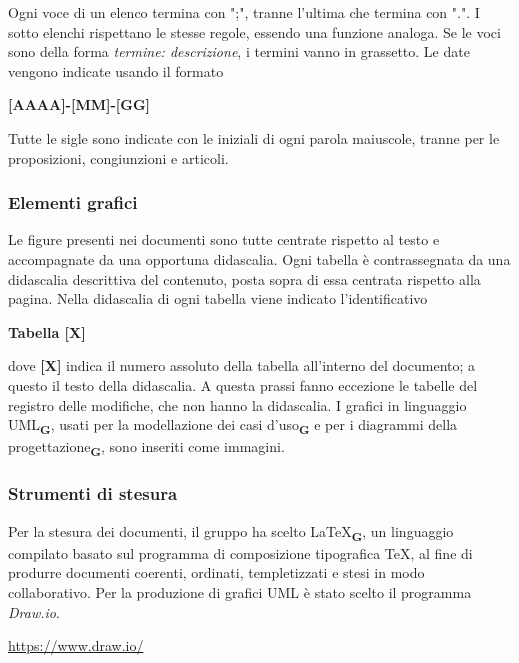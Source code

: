 Ogni voce di un elenco termina con ";", tranne l'ultima che termina con ".". I sotto elenchi rispettano le stesse regole, essendo una funzione analoga. Se le voci sono della forma \textit{termine: descrizione}, i termini vanno in grassetto.
Le date vengono indicate usando il formato
\begin{center}
    \textbf{[AAAA]-[MM]-[GG]}
\end{center}
Tutte le sigle sono indicate con le iniziali di ogni parola maiuscole, tranne per le proposizioni, congiunzioni e articoli.
\subsubsection{Elementi grafici}
Le figure presenti nei documenti sono tutte centrate rispetto al testo e accompagnate da una opportuna didascalia.
Ogni tabella è contrassegnata da una didascalia descrittiva del contenuto, posta sopra di essa centrata rispetto alla pagina.  Nella didascalia di ogni tabella viene indicato l'identificativo
\begin{center}
    \textbf{Tabella [X]}
\end{center}
dove \textbf{[X]} indica il numero assoluto della tabella all'interno del documento; a questo il testo della didascalia. A questa prassi fanno eccezione le tabelle del registro delle modifiche, che non hanno la didascalia.
I grafici in linguaggio UML\textsubscript{\textbf{G}}, usati per la modellazione dei casi d'uso\textsubscript{\textbf{G}} e per i diagrammi della progettazione\textsubscript{\textbf{G}}, sono inseriti come immagini.
\subsubsection{Strumenti di stesura}
\subsubsubsection{\LaTeX}
Per la stesura dei documenti, il gruppo ha scelto \LaTeX\textsubscript{\textbf{G}}, un linguaggio compilato basato sul programma di composizione tipografica \TeX, al fine di produrre documenti coerenti, ordinati, templetizzati e stesi in modo collaborativo.
Per la produzione di grafici UML è stato scelto il programma \textit{Draw.io}.
\begin{center}
    \href{https://www.draw.io/}{https://www.draw.io/}\\
\end{center}

